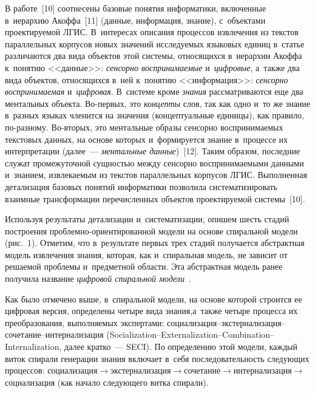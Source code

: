 \begin{multicols}{2}
  В работе~[10] соотнесены базовые понятия информатики, включенные 
в~иерархию Акоффа~[11] (данные, информация, знание), с~объектами 
про\-ек\-ти\-ру\-емой ЛГИС. В~интересах 
описания процессов извлечения из текстов параллельных кор\-пу\-сов новых 
значений ис\-сле\-ду\-емых языков$\acute{\mbox{ы}}$х \mbox{единиц} в~\mbox{статье} 
различаются два вида объектов этой сис\-те\-мы, относящихся в~иерархии Акоффа к~понятию <<данные>>: \textit{сенсорно вос\-при\-ни\-ма\-емые} и~\textit{циф\-ро\-вые}, 
а~также два вида объектов, относящихся в~ней к~понятию <<информация>>: 
\textit{сенсорно вос\-при\-ни\-ма\-емая} и~\textit{циф\-ро\-вая}. В~сис\-те\-ме кроме 
\textit{знания} рас\-смат\-ри\-ва\-ют\-ся еще два ментальных объекта. Во-пер\-вых, это 
\textit{концепты} слов, так как одно и~то же знание в~разных языках членится 
на значения (концептуальные единицы), как правило, по-раз\-но\-му.  
Во-вто\-рых, это ментальные образы сенсорно вос\-при\-ни\-ма\-емых текс\-то\-вых 
данных, на основе которых и~формируется знание в~процессе их интерпретации 
(далее~--- \textit{ментальные данные})~[12]. Таким образом, последние служат
промежуточной сущ\-ностью между сенсорно воспринимаемыми данными 
и~знанием, из\-вле\-ка\-емым из текс\-тов параллельных корпусов 
ЛГИС. Выполненная детализация 
базовых понятий информатики позволила сис\-те\-ма\-ти\-зи\-ро\-вать взаимные 
трансформации перечисленных объектов проектируемой сис\-те\-мы~[10].
  
  Используя результаты детализации и~сис\-те\-ма\-ти\-за\-ции, опишем шесть стадий 
по\-стро\-ения проб\-лем\-но-ори\-ен\-ти\-ро\-ван\-ной модели на основе 
спиральной модели (рис.~1). Отметим, что в~результате первых трех стадий 
получается абстрактная модель извлечения знания, которая, как и~спиральная 
модель, не зависит от решаемой проб\-ле\-мы и~предметной об\-ласти. Эта 
абстрактная модель ранее получила название \textit{циф\-ро\-вой спиральной 
модели}~\cite{13-zac}.
  

 
  
  Как было отмечено выше, в~спиральной модели, на осно\-ве которой строится 
ее цифровая версия, определены четыре вида знания,\linebreak  а~также четыре процесса 
их преобразования, выполняемых экспертами:  
со\-ци\-а\-ли\-за\-ция--экс\-тер\-на\-ли\-за\-ция--со\-че\-та\-ние--интер\-на\-ли\-за\-ция  
(Socialization--Externalization--Combination--Internalization, далее кратко~--- 
SECI). По определению этой модели, каждый виток спирали генерации знания 
включает в~себя по\-сле\-до\-ва\-тель\-ность сле\-ду\-ющих процессов:  
со\-ци\-а\-ли\-за\-ция\;$\to$\;экс\-тер\-на\-ли\-за\-ция\;$\to$\;со\-че\-та\-ние\;$\to$\;ин\-тер\-на\-ли\-за\-ция\;$\to$\;со\-ци\-а\-ли\-за\-ция (как 
\mbox{начало} сле\-ду\-юще\-го витка спирали).
  

\end{multicols}
